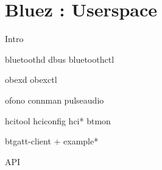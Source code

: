 \section{Bluez : Userspace}
\begin{frame}
Intro
\end{frame}

\begin{frame}
bluetoothd  dbus bluetoothctl
\end{frame}

\begin{frame}
obexd obexctl
\end{frame}

\begin{frame}
ofono connman pulseaudio
\end{frame}

\begin{frame}
hcitool hciconfig hci* btmon
\end{frame}

\begin{frame}
btgatt-client + example*
\end{frame}

\begin{frame}
API
\end{frame}


